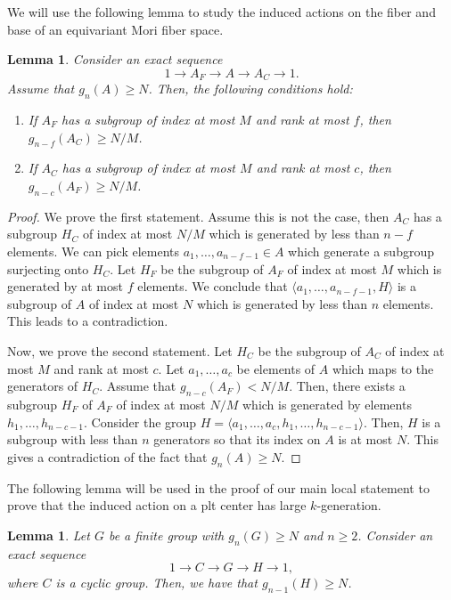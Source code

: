 \documentclass{amsart}
\newtheorem{lemma}[theorem]{Lemma}
\theoremstyle{remark}
\numberwithin{equation}{section}
\begin{document}
We will use the following lemma to study the induced actions
on the fiber and base of an equivariant Mori fiber space.

\begin{lemma}\label{lem:ses-z_m^n}
Consider an exact sequence
\[
1\rightarrow A_F \rightarrow A \rightarrow A_C \rightarrow 1.
\]
Assume that $g_n(A)\geq N$.
Then, the following conditions hold:
\begin{enumerate} 
\item If $A_F$ has a subgroup of index at most $M$ and rank at most $f$, then $g_{n-f}(A_C)\geq N/M$.
\item If $A_C$ has a subgroup of index at most $M$ and rank at most $c$, then $g_{n-c}(A_F)\geq N/M$.
\end{enumerate}
\end{lemma}

\begin{proof}
We prove the first statement.
Assume this is not the case, then $A_C$ has a subgroup $H_C$ of index at most $N/M$ 
which is generated by less than $n-f$ elements.
We can pick elements $a_1,\dots,a_{n-f-1}\in A$ which generate a subgroup surjecting onto $H_C$.
Let $H_F$ be the subgroup of $A_F$ of index at most $M$ which is generated by at most $f$ elements.
We conclude that $\langle a_1,\dots,a_{n-f-1},H\rangle$ is a subgroup of $A$ of index at most $N$ which is generated by less than $n$ elements. This leads to a contradiction.

Now, we prove the second statement.
Let $H_C$ be the subgroup of $A_C$ of index at most $M$ and rank at most $c$.
Let $a_1,\dots,a_c$ be elements of $A$ which maps to the generators of $H_C$.
Assume that $g_{n-c}(A_F)<N/M$.
Then, there exists a subgroup $H_F$ of $A_F$ of index at most $N/M$ which is generated by elements
$h_1,\dots, h_{n-c-1}$.
Consider the group $H=\langle 
a_1,\dots,a_c,h_1,\dots,h_{n-c-1}\rangle$.
Then, $H$ is a subgroup with less than $n$ generators so that its index on $A$ is at most $N$.
This gives a contradiction of the fact that $g_n(A)\geq N$.
\end{proof}


The following lemma will be used in the proof of our main local statement
to prove that the induced action on a plt center has large $k$-generation.

\begin{lemma}\label{lem:quot-cycl-k-gen}
Let $G$ be a finite group with $g_n(G)\geq N$
and $n\geq 2$.
Consider an exact sequence
\[
1\rightarrow C \rightarrow G\rightarrow H\rightarrow 1,
\]
where $C$ is a cyclic group.
Then, we have that $g_{n-1}(H) \geq N$.
\end{lemma}
\end{document}
